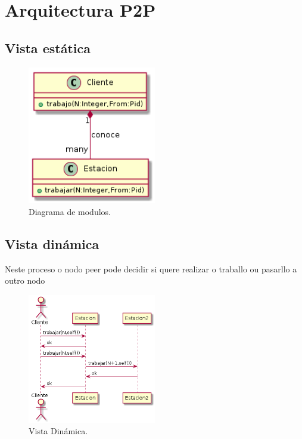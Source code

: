 \documentclass[DIV=calc,paper=a4,fontsize=11pt,onecolumn]{scrartcl}	 %
\begin{document}
\newpage
\section{Arquitectura P2P}

\subsection{Vista estática}
\begin{figure}[h]
\centering
\includegraphics[width = 0.5\textwidth]{./figuras/estaticop2p.png}
\caption{Diagrama de modulos.}
\label{fig:estp2p}
\end{figure}

\newpage
\subsection{Vista dinámica}
Neste proceso o nodo peer pode decidir si quere realizar o traballo ou pasarllo a outro nodo
\begin{figure}[!h]
\centering
\includegraphics[width = 0.5\textwidth]{./figuras/dinamicop2p.png}
\caption{Vista Dinámica.}
\label{fig:dinp2p}
\end{figure}
\end{document}
